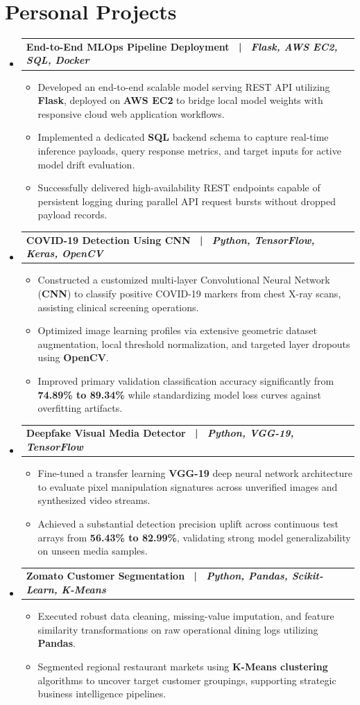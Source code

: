 \documentclass[letterpaper,10pt]{article}
\makeatletter
\newcommand{\resumeItem}[1]{
  \item\small{
    {#1 \vspace{-3pt}}
  }
}
\newcommand{\resumeProjectHeading}[2]{
  \vspace{-3pt}\item
    \begin{tabular*}{1.0\textwidth}[t]{l@{\extracolsep{\fill}}r}
      \textbf{#1} & \textbf{\small #2} \\
    \end{tabular*}\vspace{-7pt}
}
\newcommand{\resumeSubHeadingListStart}{\begin{itemize}[leftmargin=0.0in, label={}]}
\newcommand{\resumeSubHeadingListEnd}{\end{itemize}}
\newcommand{\resumeItemListStart}{\begin{itemize}}
\newcommand{\resumeItemListEnd}{\end{itemize}\vspace{0pt}}
\makeatother
\begin{document}
\section{Personal Projects}
  \resumeSubHeadingListStart
    \resumeProjectHeading
      {\textbf{End-to-End MLOps Pipeline Deployment} ~|~ \textit{Flask, AWS EC2, SQL, Docker}}{}
      \resumeItemListStart
        \resumeItem{Developed an end-to-end scalable model serving REST API utilizing \textbf{Flask}, deployed on \textbf{AWS EC2} to bridge local model weights with responsive cloud web application workflows.}
        \resumeItem{Implemented a dedicated \textbf{SQL} backend schema to capture real-time inference payloads, query response metrics, and target inputs for active model drift evaluation.}
        \resumeItem{Successfully delivered high-availability REST endpoints capable of persistent logging during parallel API request bursts without dropped payload records.}
      \resumeItemListEnd

    \resumeProjectHeading
      {\textbf{COVID-19 Detection Using CNN} ~|~ \textit{Python, TensorFlow, Keras, OpenCV}}{}
      \resumeItemListStart
        \resumeItem{Constructed a customized multi-layer Convolutional Neural Network (\textbf{CNN}) to classify positive COVID-19 markers from chest X-ray scans, assisting clinical screening operations.}
        \resumeItem{Optimized image learning profiles via extensive geometric dataset augmentation, local threshold normalization, and targeted layer dropouts using \textbf{OpenCV}.}
        \resumeItem{Improved primary validation classification accuracy significantly from \textbf{74.89\% to 89.34\%} while standardizing model loss curves against overfitting artifacts.}
      \resumeItemListEnd

    \resumeProjectHeading
      {\textbf{Deepfake Visual Media Detector} ~|~ \textit{Python, VGG-19, TensorFlow}}{}
      \resumeItemListStart
        \resumeItem{Fine-tuned a transfer learning \textbf{VGG-19} deep neural network architecture to evaluate pixel manipulation signatures across unverified images and synthesized video streams.}
        \resumeItem{Achieved a substantial detection precision uplift across continuous test arrays from \textbf{56.43\% to 82.99\%}, validating strong model generalizability on unseen media samples.}
      \resumeItemListEnd

    \resumeProjectHeading
      {\textbf{Zomato Customer Segmentation} ~|~ \textit{Python, Pandas, Scikit-Learn, K-Means}}{}
      \resumeItemListStart
        \resumeItem{Executed robust data cleaning, missing-value imputation, and feature similarity transformations on raw operational dining logs utilizing \textbf{Pandas}.}
        \resumeItem{Segmented regional restaurant markets using \textbf{K-Means clustering} algorithms to uncover target customer groupings, supporting strategic business intelligence pipelines.}
      \resumeItemListEnd
  \resumeSubHeadingListEnd
\end{document}
